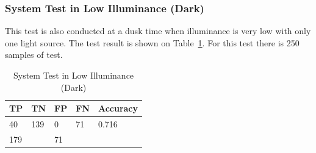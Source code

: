 \subsubsection{System Test in Low Illuminance (Dark)}
\label{subsubsec:hedect_test_lowillum_dark}

\par This test is also conducted at a dusk time when illuminance is very low with only one light source. The test result is shown on Table~\ref{tb:systest_lowillum_dark}. For this test there is 250 samples of test.

\begin{table}
  \centering
  \caption{System Test in Low Illuminance (Dark)}
  \label{tb:systest_lowillum_dark}
  \begin{tabular}{|l|l|l|l|l|} 
    \hline
    TP & TN                     & FP & FN                 & Accuracy  \\ 
    \hline
    40 & 139                    & 0  & 71                 & 0.716     \\ 
    \hline
    \multicolumn{2}{|l|}{179}   & \multicolumn{2}{l|}{71} &           \\
    \hline
  \end{tabular}
\end{table}

